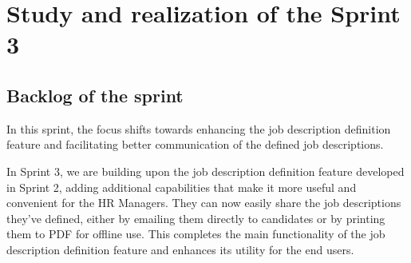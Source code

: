 \chapter{Study and realization of the Sprint 3}
\minitoc
\newpage

\setcounter{secnumdepth}{2} %
\section{Backlog of the sprint}
In this sprint, the focus shifts towards enhancing the job description definition feature and facilitating better communication of the defined job descriptions.

In Sprint 3, we are building upon the job description definition feature developed in Sprint 2, adding additional capabilities that make it more useful and convenient for the HR Managers. They can now easily share the job descriptions they've defined, either by emailing them directly to candidates or by printing them to PDF for offline use. This completes the main functionality of the job description definition feature and enhances its utility for the end users.

